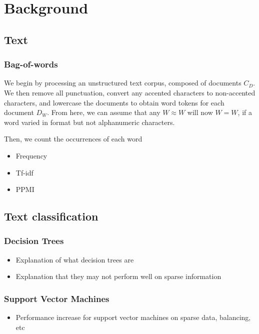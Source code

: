 \chapter{Background}
\section{Text}
\subsection{Bag-of-words}\label{background:BOW}
We begin by processing an unstructured text corpus, composed of documents $C_D$. We then remove all punctuation, convert any accented characters to non-accented characters, and lowercase the documents to obtain word tokens for each document $D_W$. From here, we can assume that any $W \approx W$ will now $W = W$, if a word varied in format but not alphanumeric characters. 

Then, we count the occurrences of each word
\begin{itemize}
	\item Frequency
	\item Tf-idf
	\item PPMI
\end{itemize}
\section{Text classification}
\subsection{Decision Trees}
\begin{itemize}
	\item Explanation of what decision trees are
	\item Explanation that they may not perform well on sparse information
\end{itemize}
\subsection{Support Vector Machines}
\begin{itemize}
	\item Performance increase for support vector machines on sparse data, balancing, etc
\end{itemize}
